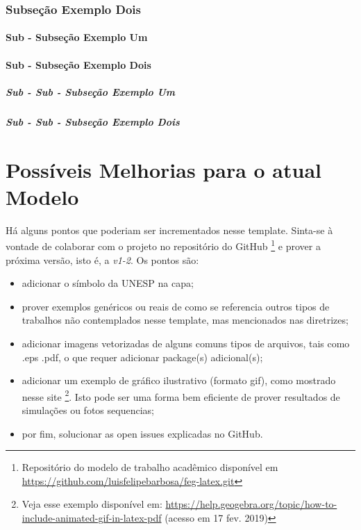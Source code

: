 \documentclass[
  12pt,		%
  a4paper,	%
  openright,%
  oneside,	%
  chapter=TITLE,		%
  section=TITLE,		%
  english,	%
  french,	%
  spanish,	%
  brazil
]{abntex2}
\begin{document}
                \subsection{Subseção Exemplo Dois}
                \lipsum[7]
                
                    \subsubsection{Sub - Subseção Exemplo Um}
                    \lipsum[6]
                    
                    \subsubsection{Sub - Subseção Exemplo Dois}
                    \lipsum[12]
                    
                        \paragraph{Sub - Sub - Subseção Exemplo Um}
                        \lipsum[11]
                        
                        \paragraph{Sub - Sub - Subseção Exemplo Dois}
                        \lipsum[13]

     \chapter{Possíveis Melhorias para o atual Modelo}
        
        Há alguns pontos que poderiam ser incrementados nesse template. Sinta-se à vontade de colaborar com o projeto no repositório do GitHub \footnote{Repositório do modelo de trabalho acadêmico disponível em \url{https://github.com/luisfelipebarbosa/feg-latex.git}} e prover a próxima versão, isto é, a \emph{v1-2}. Os pontos são:
        
        
        \begin{itemize}
            \item adicionar o símbolo da UNESP na capa;
            \item prover exemplos genéricos ou reais de como se referencia outros tipos de trabalhos não contemplados nesse template, mas mencionados nas diretrizes;
            \item adicionar imagens vetorizadas de alguns comuns tipos de arquivos, tais como .eps .pdf, o que requer  adicionar  package(s) adicional(s);
            \item adicionar um exemplo de gráfico ilustrativo (formato gif), como mostrado nesse site \footnote{Veja esse exemplo disponível em: \url{https://help.geogebra.org/topic/how-to-include-animated-gif-in-latex-pdf} (acesso em 17 fev. 2019)}. Isto pode ser uma forma bem eficiente de prover resultados de simulações ou fotos sequencias;
            \item por fim, solucionar as open issues explicadas no GitHub.
        \end{itemize}
     
\end{document}

